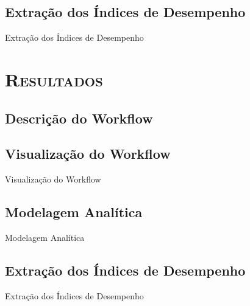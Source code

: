 \documentclass[xcolor=x11names,compress]{beamer}
\renewcommand{\(}{\begin{columns}}
\renewcommand{\)}{\end{columns}}
\newcommand{\<}[1]{\begin{column}{#1}}
\renewcommand{\>}{\end{column}}
\begin{document}
    \subsection{Extração dos Índices de Desempenho}
        \begin{frame}{Extração dos Índices de Desempenho}

        \end{frame}

\section{\scshape Resultados}

    \subsection{Descrição do Workflow}


    \subsection{Visualização do Workflow}
        \begin{frame}{Visualização do Workflow}

        \end{frame}

    \subsection{Modelagem Analítica}
        \begin{frame}{Modelagem Analítica}

        \end{frame}

    \subsection{Extração dos Índices de Desempenho}
        \begin{frame}{Extração dos Índices de Desempenho}

        \end{frame}
\end{document}
